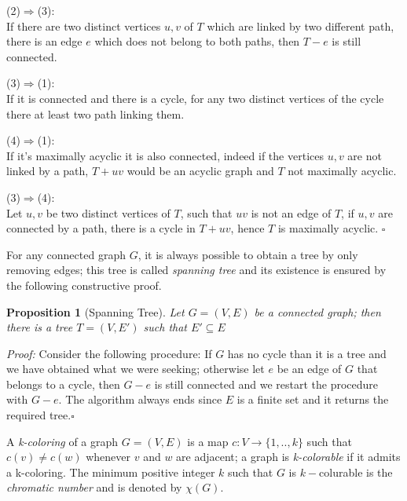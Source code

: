 \documentclass[a4paper,12pt,oneside]{book}
\newtheorem{proposition}[theorem]{Proposition}
\newcommand*{\QED}{\hfill\ensuremath{\square}}
\begin{document}
(2)$\Rightarrow$(3):\\
If there are two distinct vertices $u,v$ of $T$ which are linked by two different  path, there is an edge $e$ which does not belong to both paths, then $T-e$ is still connected.

(3)$\Rightarrow$(1):\\
If it is connected and there is a cycle, for any two distinct vertices of the cycle there at least two path linking them.

(4)$\Rightarrow$(1):\\
If it's maximally acyclic it is also connected, indeed if the vertices $u,v$ are not linked by a path, $T+uv$ would be an acyclic graph and $T$ not maximally acyclic. 

(3)$\Rightarrow$(4):\\
Let $u,v$ be two distinct vertices of $T$, such that $uv$ is not an edge of $T$, if $u,v$ are connected by a path, there is a cycle in $T+uv$, hence $T$ is maximally acyclic. \QED

 For any connected graph $G$, it is always possible to obtain a tree by only removing edges; this tree is called \textit{spanning tree} and its existence is ensured by the following constructive proof.
\begin{proposition}[Spanning Tree]
Let $G=(V,E)$ be a connected graph; then there is a tree $T=(V,E')$ such that $E'\subseteq E$
\end{proposition}
\textit{Proof:}
Consider the following procedure: If $G$ has no cycle than it is a tree and we have obtained what we were seeking; otherwise let $e$ be an edge of $G$ that belongs to a cycle, then $G-e$ is still connected and we restart the procedure with $G-e$.
The algorithm always ends since $E$ is a finite set and it returns the required tree.\QED


A \textit{k-coloring} of a graph $G=(V,E)$ is a map $c:V \rightarrow \{1,..,k\} $ such that $c(v) \neq c(w) $ whenever $v$ and $w$ are adjacent; a graph is \textit{k-colorable} if it admits a k-coloring. The minimum positive integer $k$ such that $G$ is $k-$colurable is the \textit{chromatic number} and is denoted by $\chi (G)$.
\end{document}
